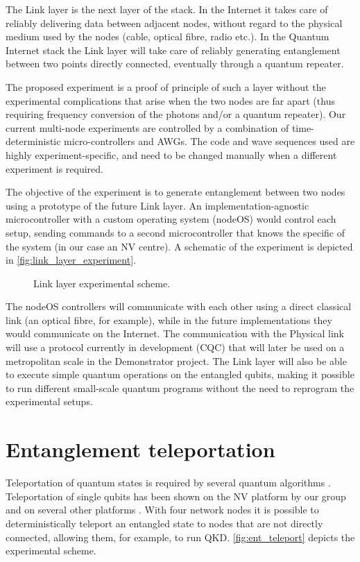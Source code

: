 \documentclass[a4paper, twoside]{article}
\begin{document}
The Link layer is the next layer of the stack. In the Internet it takes care of reliably delivering data between adjacent nodes, without regard to the physical medium used by the nodes (cable, optical fibre, radio etc.).  In the Quantum Internet stack the Link layer will take care of reliably generating entanglement between two points directly connected, eventually through a quantum repeater.

The proposed experiment is a proof of principle of such a layer without the experimental complications that arise when the two nodes are far apart (thus requiring frequency conversion of the photons and/or a quantum repeater).
Our current multi-node experiments are controlled by a combination of time-deterministic micro-controllers and \acp{AWG}. The code and wave sequences used are highly experiment-specific, and need to be changed manually when a different experiment is required.

The objective of the experiment is to generate entanglement between two nodes using a prototype of the future Link layer.
An implementation-agnostic microcontroller with a custom operating system (nodeOS) would control each setup, sending commands to a second microcontroller that knows the specific of the system (in our case an NV centre). A schematic of the experiment is depicted in \autoref{fig:link_layer_experiment}.

\begin{figure}
	\caption{Link layer experimental scheme.}
	\label{fig:link_layer_experiment}
\end{figure}

The nodeOS controllers will communicate with each other using a direct classical link (an optical fibre, for example), while in the future implementations they would communicate on the Internet. The communication with the Physical link will use a protocol currently in development (\ac{CQC}) that will later be used on a metropolitan scale in the Demonstrator project.
The Link layer will also be able to execute simple quantum operations on the entangled qubits, making it possible to run different small-scale quantum programs without the need to reprogram the experimental setups.


\section{Entanglement teleportation}
\label{sec:teleportation}
Teleportation of quantum states is required by several quantum algorithms . Teleportation of single qubits has been shown on the NV platform by our group \cite{Pfaff2014} and on several other platforms \cite{Takeda2013, Wang2015, Valivarthi2016}.
With four network nodes it is possible to deterministically teleport an entangled state to nodes that are not directly connected, allowing them, for example, to run \ac{QKD}. \autoref{fig:ent_teleport} depicts the experimental scheme. 
\end{document}

